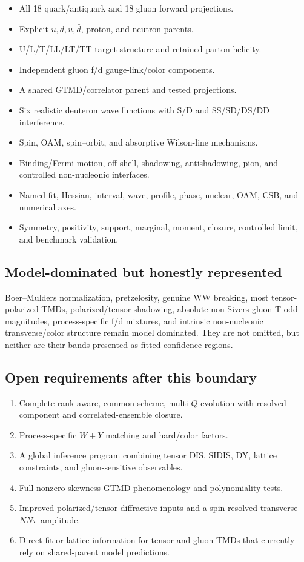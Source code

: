 \documentclass[11pt]{article}
\begin{document}
\begin{itemize}
  \item All 18 quark/antiquark and 18 gluon forward projections.
  \item Explicit \(u,d,\bar u,\bar d\), proton, and neutron parents.
  \item U/L/T/LL/LT/TT target structure and retained parton helicity.
  \item Independent gluon f/d gauge-link/color components.
  \item A shared GTMD/correlator parent and tested projections.
  \item Six realistic deuteron wave functions with S/D and SS/SD/DS/DD
  interference.
  \item Spin, OAM, spin--orbit, and absorptive Wilson-line mechanisms.
  \item Binding/Fermi motion, off-shell, shadowing, antishadowing, pion, and
  controlled non-nucleonic interfaces.
  \item Named fit, Hessian, interval, wave, profile, phase, nuclear, OAM,
  CSB, and numerical axes.
  \item Symmetry, positivity, support, marginal, moment, closure, controlled
  limit, and benchmark validation.
\end{itemize}

\subsection{Model-dominated but honestly represented}

Boer--Mulders normalization, pretzelosity, genuine WW breaking, most
tensor-polarized TMDs, polarized/tensor shadowing, absolute non-Sivers
gluon T-odd magnitudes, process-specific f/d mixtures, and intrinsic
non-nucleonic transverse/color structure remain model dominated.  They are
not omitted, but neither are their bands presented as fitted confidence
regions.

\subsection{Open requirements after this boundary}

\begin{enumerate}
  \item Complete rank-aware, common-scheme, multi-\(Q\) evolution with
  resolved-component and correlated-ensemble closure.
  \item Process-specific \(W+Y\) matching and hard/color factors.
  \item A global inference program combining tensor DIS, SIDIS, DY,
  lattice constraints, and gluon-sensitive observables.
  \item Full nonzero-skewness GTMD phenomenology and polynomiality tests.
  \item Improved polarized/tensor diffractive inputs and a spin-resolved
  transverse \(NN\pi\) amplitude.
  \item Direct fit or lattice information for tensor and gluon TMDs that
  currently rely on shared-parent model predictions.
\end{enumerate}
\end{document}
